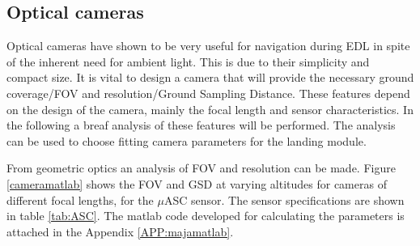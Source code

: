  
\subsection{Optical cameras}

Optical cameras have shown to be very useful for navigation during EDL in spite of the inherent need for ambient light. This is due to their simplicity and compact size. It is vital to design a camera that will provide the necessary ground coverage/FOV and resolution/Ground Sampling Distance. These features depend on the design of the camera, mainly the focal length and sensor characteristics. In the following a breaf analysis of these features will be performed. The analysis can be used to choose fitting camera parameters for the landing module. 

From geometric optics an analysis of FOV and resolution can be made. Figure \ref{cameramatlab} shows the FOV  and GSD at varying altitudes for cameras of different focal lengths, for the $\mu$ASC sensor. The sensor specifications are shown in table \ref{tab:ASC}. The matlab code developed for calculating the parameters is attached in the Appendix \ref{APP:majamatlab}.

